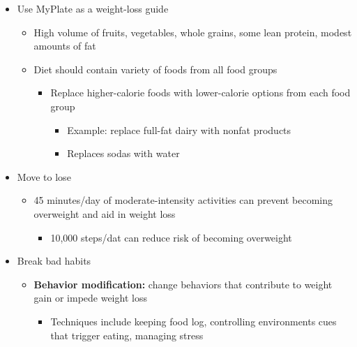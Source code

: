 \documentclass[12pt]{article}
\begin{document}
\begin{itemize}
                \item Use MyPlate as a weight-loss guide
                    \begin{itemize}
                        \item High volume of fruits, vegetables, whole grains, some lean protein, modest amounts of fat
                        \item Diet should contain variety of foods from all food groups
                            \begin{itemize}
                                \item Replace higher-calorie foods with lower-calorie options from each food group
                                    \begin{itemize}
                                        \item Example: replace full-fat dairy with nonfat products
                                        \item Replaces sodas with water
                                    \end{itemize}
                            \end{itemize}
                    \end{itemize}
                \item Move to lose
                    \begin{itemize}
                        \item 45 minutes/day of moderate-intensity activities can prevent becoming overweight and aid in weight loss
                            \begin{itemize}
                                \item 10,000 steps/dat can reduce risk of becoming overweight
                            \end{itemize}
                    \end{itemize}
                \item Break bad habits
                    \begin{itemize}
                        \item \textbf{Behavior modification:} change behaviors that contribute to weight gain or impede weight loss
                            \begin{itemize}
                                \item Techniques include keeping food log, controlling environments cues that trigger eating, managing stress
                            \end{itemize}
                    \end{itemize}
            \end{itemize}
\end{document}
